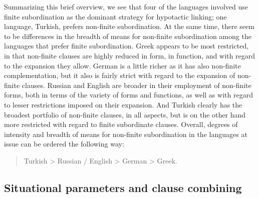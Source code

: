 \documentclass[output=paper,colorlinks,citecolor=brown]{langscibook}
\begin{document}
Summarizing this brief overview, we see that four of the languages involved use finite subordination as the dominant strategy for hypotactic linking; one language, Turkish, prefers non-finite subordination. At the same time, there seem to be differences in the breadth of means for non-finite subordination among the languages that prefer finite subordination. Greek appears to be most restricted, in that non-finite clauses are highly reduced in form, in function, and with regard to the expansion they allow. German is a little richer as it has also non-finite complementation, but it also is fairly strict with regard to the expansion of non-finite clauses. Russian and English are broader in their employment of non-finite forms, both in terms of the variety of forms and functions, as well as with regard to lesser restrictions imposed on their expansion. And Turkish clearly has the broadest portfolio of non-finite clauses, in all aspects, but is on the other hand more restricted with regard to finite subordinate clauses. Overall, degrees of intensity and breadth of means for non-finite subordination in the languages at issue can be ordered the following way: 

\begin{quote} Turkish > Russian / English > German > Greek.\end{quote}

\subsection{Situational parameters and clause combining} \label{sec:schroederetal:1.3}
\end{document}
